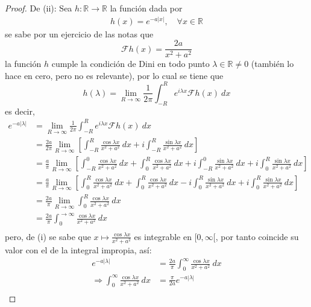\documentclass[12pt]{report}
\theoremstyle{largebreak}
\newcommand\abs[1]{\ensuremath{\left|#1\right|}}
\newcommand\cf[3]{\ensuremath{#1:#2\rightarrow#3}}
\newcommand{\fou}[1]{\ensuremath{\mathcal{F}#1}}
\begin{document}
\begin{proof}
        De (ii): Sea $\cf{h}{\mathbb{R}}{\mathbb{R}}$ la función dada por
        \begin{equation*}
            \begin{split}
                h(x)=e^{-a\abs{x}},\quad\forall x\in\mathbb{R}
            \end{split}
        \end{equation*}
        se sabe por un ejercicio de las notas que
        \begin{equation*}
            \fou{h}(x)=\frac{2a}{x^2+a^2}
        \end{equation*}
        la función $h$ cumple la condición de Dini en todo punto $\lambda\in\mathbb{R}\neq0$ (también lo hace en cero, pero no es relevante), por lo cual se tiene que
        \begin{equation*}
            h(\lambda)=\lim_{ R\rightarrow\infty}\frac{1}{2\pi}\int_{ -R}^R e^{ i\lambda x}\fou{h}(x)\:dx
        \end{equation*}
        es decir,
        \begin{equation*}
            \begin{split}
                e^{ -a\abs{\lambda}}&=\lim_{ R\rightarrow\infty}\frac{1}{2\pi}\int_{ -R}^R e^{ i\lambda x}\fou{h}(x)\:dx\\
                &=\frac{2a}{2\pi}\lim_{ R\rightarrow\infty}\left[\int_{ -R}^R\frac{\cos\lambda x}{x^2+a^2}\:dx+i\int_{ -R}^R\frac{\sin\lambda x}{x^2+a^2}\:dx \right] \\
                &=\frac{a}{\pi}\lim_{ R\rightarrow\infty}\left[\int_{ -R}^0\frac{\cos\lambda x}{x^2+a^2}\:dx+\int_{0}^R\frac{\cos\lambda x}{x^2+a^2}\:dx+i\int_{ -R}^0\frac{\sin\lambda x}{x^2+a^2}\:dx+i\int_{0}^R\frac{\sin\lambda x}{x^2+a^2}\:dx \right]\\
                &=\frac{a}{\pi}\lim_{ R\rightarrow\infty}\left[\int_{0}^R\frac{\cos\lambda x}{x^2+a^2}\:dx+\int_{0}^R\frac{\cos\lambda x}{x^2+a^2}\:dx-i\int_{0}^R\frac{\sin\lambda x}{x^2+a^2}\:dx+i\int_{0}^R\frac{\sin\lambda x}{x^2+a^2}\:dx\right]\\
                &=\frac{2a}{\pi}\lim_{ R\rightarrow\infty}\int_{0}^R\frac{\cos\lambda x}{x^2+a^2}\:dx\\
                &=\frac{2a}{\pi}\int_{0}^{\rightarrow\infty}\frac{\cos\lambda x}{x^2+a^2}\:dx\\
            \end{split}
        \end{equation*}
        pero, de (i) se sabe que $x\mapsto\frac{\cos\lambda x}{x^2+a^2}$ es integrable en $[0,\infty[$, por tanto coincide su valor con el de la integral impropia, así:
        \begin{equation*}
            \begin{split}
                e^{ -a\abs{\lambda}}&=\frac{2a}{\pi}\int_{0}^{\infty}\frac{\cos\lambda x}{x^2+a^2}\:dx\\
                \Rightarrow \int_{0}^{\infty}\frac{\cos\lambda x}{x^2+a^2}\:dx&=\frac{\pi}{2a}e^{ -a\abs{\lambda}}\\
            \end{split}
        \end{equation*}


\end{proof}
\end{document}
